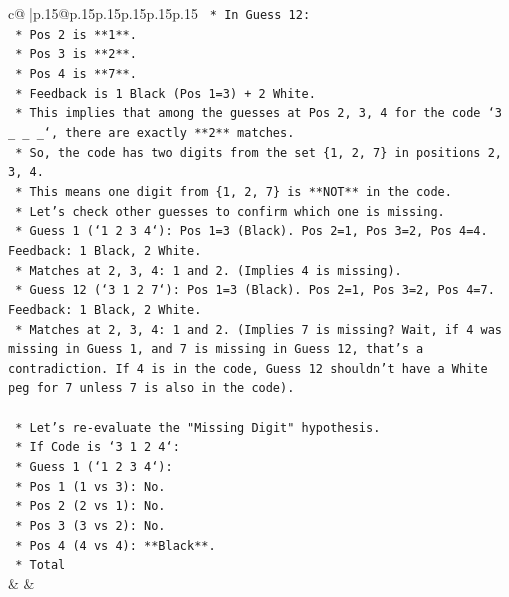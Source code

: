 \documentclass{article}
\begin{document}
{\begin{supertabular}{c@{$\;$}|p{.15\linewidth}@{}p{.15\linewidth}p{.15\linewidth}p{.15\linewidth}p{.15\linewidth}p{.15\linewidth}}
{{{\texttt{    *   In Guess 12:} \\
\texttt{        *   Pos 2 is **1**.} \\
\texttt{        *   Pos 3 is **2**.} \\
\texttt{        *   Pos 4 is **7**.} \\
\texttt{    *   Feedback is 1 Black (Pos 1=3) + 2 White.} \\
\texttt{    *   This implies that among the guesses at Pos 2, 3, 4 for the code `3 \_ \_ \_`, there are exactly **2** matches.} \\
\texttt{    *   So, the code has two digits from the set \{1, 2, 7\} in positions 2, 3, 4.} \\
\texttt{    *   This means one digit from \{1, 2, 7\} is **NOT** in the code.} \\
\texttt{    *   Let's check other guesses to confirm which one is missing.} \\
\texttt{        *   Guess 1 (`1 2 3 4`): Pos 1=3 (Black). Pos 2=1, Pos 3=2, Pos 4=4. Feedback: 1 Black, 2 White.} \\
\texttt{            *   Matches at 2, 3, 4: 1 and 2. (Implies 4 is missing).} \\
\texttt{        *   Guess 12 (`3 1 2 7`): Pos 1=3 (Black). Pos 2=1, Pos 3=2, Pos 4=7. Feedback: 1 Black, 2 White.} \\
\texttt{            *   Matches at 2, 3, 4: 1 and 2. (Implies 7 is missing? Wait, if 4 was missing in Guess 1, and 7 is missing in Guess 12, that's a contradiction. If 4 is in the code, Guess 12 shouldn't have a White peg for 7 unless 7 is also in the code).} \\
\\ 
\texttt{    *   Let's re{-}evaluate the "Missing Digit" hypothesis.} \\
\texttt{        *   If Code is `3 1 2 4`:} \\
\texttt{            *   Guess 1 (`1 2 3 4`):} \\
\texttt{                *   Pos 1 (1 vs 3): No.} \\
\texttt{                *   Pos 2 (2 vs 1): No.} \\
\texttt{                *   Pos 3 (3 vs 2): No.} \\
\texttt{                *   Pos 4 (4 vs 4): **Black**.} \\
\texttt{                *   Total} \\
            }
        }
    }
    & & \\ \\


\end{supertabular}}
\end{document}
